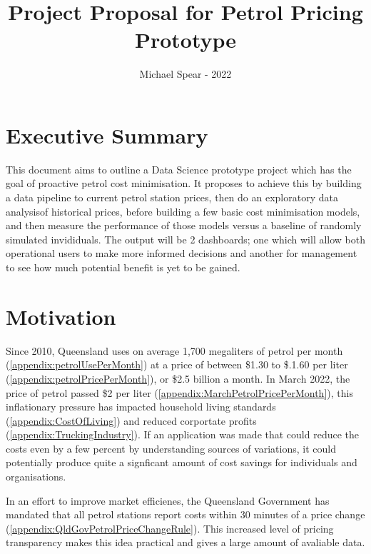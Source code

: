 \documentclass[10pt]{article} %
\title{Project Proposal for Petrol Pricing Prototype}
\author{Michael Spear - 2022}
\date{} %
\begin{document}
\maketitle

\section{Executive Summary}
This document aims to outline a Data Science prototype project which has the goal of proactive  petrol cost minimisation. It proposes to achieve this by building a data pipeline to current petrol station prices, then do an exploratory data analysisof historical prices, before building a few basic cost minimisation models, and then measure the performance of those models versus a baseline of randomly simulated invididuals. The output will be 2 dashboards; one which will allow both operational users to make more informed decisions and another for management to see how much potential benefit is yet to be gained.

\section{Motivation}
Since 2010, Queensland uses on average 1,700 megaliters of petrol per month (\ref{appendix:petrolUsePerMonth}) at a price of between \$1.30 to \$.1.60 per liter  (\ref{appendix:petrolPricePerMonth}), or \$2.5 billion a month. 
In March 2022, the price of petrol passed \$2 per liter  (\ref{appendix:MarchPetrolPricePerMonth}), this inflationary pressure has impacted household living standards (\ref{appendix:CostOfLiving}) and reduced corportate profits (\ref{appendix:TruckingIndustry}). 
If an application was made that could reduce the costs even by a few percent by understanding sources of variations, it could potentially produce quite a signficant amount of cost savings for individuals and organisations.

In an effort to improve market efficienes, the Queensland Government has mandated that all petrol stations report costs within 30 minutes of a price change  (\ref{appendix:QldGovPetrolPriceChangeRule}). This increased level of pricing transparency makes this idea practical and gives a large amount of avaliable data.
\end{document}
